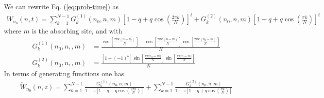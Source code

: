 \documentclass[10pt, hidelinks, superscriptaddress, amsmath, amssymb, aps, pre]{revtex4-2}
\begin{document}
We can rewrite Eq. (\ref{eq:prob-time}) as
\begin{align}
W_{n_0}(n,t)= \sum_{k=1}^{N-1}G^{(1)}_k(n_0,n,m)\left[1-q+q\cos\left(\frac{2 \pi k}{N}\right)\right]^t +G^{(2)}_k(n_0,n,m)\left[1-q+q\cos\left(\frac{\pi k}{N}\right)\right]^t 
\label{eq:compactprob_abs}
\end{align}
where $m$ is the absorbing site, and with
\begin{align}
G^{(1)}_k(n_0,n,,m)&= \frac{\cos\left[\frac{2\pi k (n-n_0)}{N}\right]-\cos\left[\frac{2\pi k (n-m)}{N}\right]\cos\left[\frac{2\pi k (n_0-m)}{N}\right]}{N} \nonumber \\
G^{(2)}_k(n_0,n,,m)&=\frac{\left[1-(-1)^k\right]\sin\left[\frac{\pi k |n_0-m|}{N}\right]\!\sin\left[\frac{\pi k |n-m|}{N}\right]}{N}
\label{eq:Gk}
\end{align}
In terms of generating functions one has
\begin{align}
\widetilde{W}_{n_0}(n,z)= \sum_{k=1}^{N-1}\frac{G^{(1)}_k(n_0,n,m)}{1-z\left[1-q+q\cos\left(\frac{2 \pi k}{N}\right)\right]} + \sum_{k=1}^{N-1}\frac{G^{(2)}_k(n_0,n,m)}{1-z\left[1-q+q\cos\left(\frac{\pi k}{N}\right)\right]} 
\label{eq:compactprob_abs_z}
\end{align}
\end{document}
